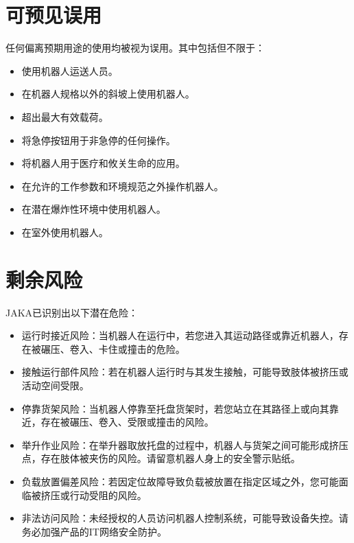 \documentclass[a4paper,11pt,english,openany,oneside]{sphinxmanual}
\begin{document}
\section{可预见误用}
\label{\detokenize{05 _u5b89_u5168_u89c4_u8303:id10}}
\sphinxAtStartPar
任何偏离预期用途的使用均被视为误用。其中包括但不限于：
\begin{itemize}
\item {} 
\sphinxAtStartPar
使用机器人运送人员。

\item {} 
\sphinxAtStartPar
在机器人规格以外的斜坡上使用机器人。

\item {} 
\sphinxAtStartPar
超出最大有效载荷。

\item {} 
\sphinxAtStartPar
将急停按钮用于非急停的任何操作。

\item {} 
\sphinxAtStartPar
将机器人用于医疗和攸关生命的应用。

\item {} 
\sphinxAtStartPar
在允许的工作参数和环境规范之外操作机器人。

\item {} 
\sphinxAtStartPar
在潜在爆炸性环境中使用机器人。

\item {} 
\sphinxAtStartPar
在室外使用机器人。

\end{itemize}


\section{剩余风险}
\label{\detokenize{05 _u5b89_u5168_u89c4_u8303:id11}}
\sphinxAtStartPar
JAKA已识别出以下潜在危险：
\begin{itemize}
\item {} 
\sphinxAtStartPar
运行时接近风险：当机器人在运行中，若您进入其运动路径或靠近机器人，存在被碾压、卷入、卡住或撞击的危险。

\item {} 
\sphinxAtStartPar
接触运行部件风险：若在机器人运行时与其发生接触，可能导致肢体被挤压或活动空间受限。

\item {} 
\sphinxAtStartPar
停靠货架风险：当机器人停靠至托盘货架时，若您站立在其路径上或向其靠近，存在被碾压、卷入、受限或撞击的风险。

\item {} 
\sphinxAtStartPar
举升作业风险：在举升器取放托盘的过程中，机器人与货架之间可能形成挤压点，存在肢体被夹伤的风险。请留意机器人身上的安全警示贴纸。

\item {} 
\sphinxAtStartPar
负载放置偏差风险：若因定位故障导致负载被放置在指定区域之外，您可能面临被挤压或行动受阻的风险。

\item {} 
\sphinxAtStartPar
非法访问风险：未经授权的人员访问机器人控制系统，可能导致设备失控。请务必加强产品的IT网络安全防护。

\end{itemize}
\end{document}
